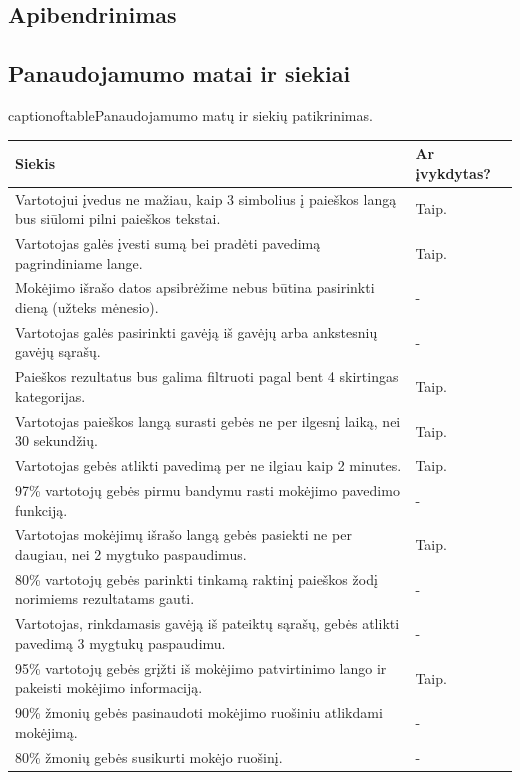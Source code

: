 \documentclass[oneside]{VUMIFPSkursinis}
\begin{document}
\subsection{Apibendrinimas}
\subsection{Panaudojamumo matai ir siekiai}
\begin{center}
	captionof{table}{Panaudojamumo matų ir siekių patikrinimas.}
    \begin{tabular}{ |p{12cm}| p{3cm} |}
    \hline
	Siekis & Ar įvykdytas? \\ \hline
	Vartotojui įvedus ne mažiau, kaip 3 simbolius į paieškos langą bus siūlomi pilni paieškos tekstai. & Taip. \\ \hline
	Vartotojas galės įvesti sumą bei pradėti pavedimą pagrindiniame lange. & Taip. \\ \hline
	Mokėjimo išrašo datos apsibrėžime nebus būtina pasirinkti dieną (užteks mėnesio). & - \\ \hline
	Vartotojas galės pasirinkti gavėją iš gavėjų arba ankstesnių gavėjų sąrašų. & - \\ \hline
	Paieškos rezultatus bus galima filtruoti pagal bent 4 skirtingas kategorijas. & Taip. \\ \hline
	Vartotojas paieškos langą surasti gebės ne per ilgesnį laiką, nei 30 sekundžių. & Taip. \\ \hline
	Vartotojas gebės atlikti pavedimą per ne ilgiau kaip 2 minutes. & Taip. \\ \hline
	97\% vartotojų gebės pirmu bandymu rasti mokėjimo pavedimo funkciją. & - \\ \hline
	Vartotojas mokėjimų išrašo langą gebės pasiekti ne per daugiau, nei 2 mygtuko paspaudimus. & Taip. \\ \hline
	80\% vartotojų gebės parinkti tinkamą raktinį paieškos žodį norimiems rezultatams gauti. & - \\ \hline
	Vartotojas, rinkdamasis gavėją iš pateiktų sąrašų, gebės atlikti pavedimą 3 mygtukų paspaudimu. & - \\ \hline
	95\% vartotojų gebės grįžti iš mokėjimo patvirtinimo lango ir pakeisti mokėjimo informaciją. & Taip. \\ \hline
	90\% žmonių gebės pasinaudoti mokėjimo ruošiniu atlikdami mokėjimą. & - \\ \hline
	80\% žmonių gebės susikurti mokėjo ruošinį. & - \\ \hline

    \end{tabular}
\end{center}
\end{document}
